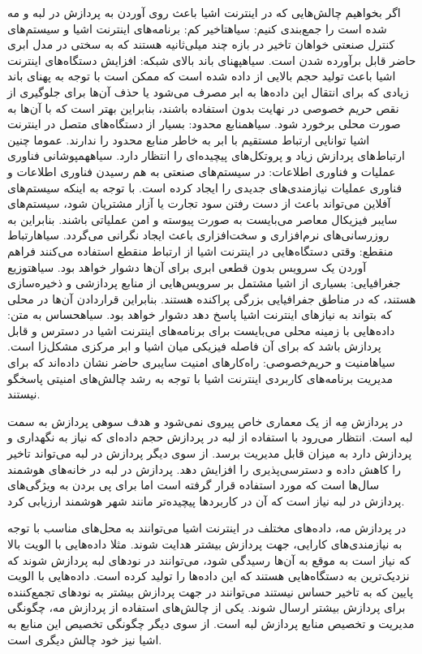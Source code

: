 اگر بخواهیم چالش‌هایی که در اینترنت اشیا باعث روی آوردن به پردازش در لبه و مه شده است را جمع‌بندی کنیم:
 ‌سیاه{تاخیر کم}: برنامه‌های اینترنت اشیا و سیستم‌های کنترل صنعتی خواهان تاخیر در بازه چند میلی‌ثانیه هستند که به سختی در مدل ابری حاضر قابل برآورده شدن است.
 ‌سیاه{پهنای باند بالای شبکه}: افزایش دستگاه‌های اینترنت اشیا باعث تولید حجم بالایی از داده شده است که ممکن است با توجه به پهنای باند زیادی که برای
انتقال این داده‌ها به ابر مصرف می‌شود یا حذف آن‌ها برای جلوگیری از نقص حریم خصوصی در نهایت
بدون استفاده باشند، بنابراین بهتر است که با آن‌ها به صورت محلی برخورد شود.
 ‌سیاه{منابع محدود}: بسیار از دستگاه‌های متصل در اینترنت اشیا توانایی ارتباط مستقیم با ابر به خاطر منابع محدود را ندارند. عموما چنین ارتباط‌های پردازش زیاد و پروتکل‌های پیچیده‌ای را انتظار دارد.
 ‌سیاه{همپوشانی فناوری عملیات و فناوری اطلاعات}: در سیستم‌های صنعتی به هم رسیدن فناوری اطلاعات و فناوری عملیات نیازمندی‌های جدیدی را ایجاد کرده است. با توجه به اینکه سیستم‌های آفلاین
می‌تواند باعث از دست رفتن سود تجارت یا آزار مشتریان شود، سیستم‌های سایبر فیزیکال معاصر می‌بایست به صورت پیوسته و امن عملیاتی باشند. بنابراین به روزرسانی‌های نرم‌افزاری و سخت‌افزاری باعث ایجاد نگرانی می‌گردد.
 ‌سیاه{ارتباط منقطع}: وقتی دستگاه‌هایی در اینترنت اشیا از ارتباط منقطع استفاده می‌کنند فراهم آوردن یک سرویس بدون قطعی ابری برای آن‌ها دشوار خواهد بود.
 ‌سیاه{توزیع جغرافیایی}: بسیاری از اشیا مشتمل بر سرویس‌هایی از منابع پردازشی و ذخیره‌سازی هستند، که در مناطق جفرافیایی بزرگی پراکنده هستند. بنابراین قراردادن آن‌ها در محلی که بتواند به نیازهای اینترنت اشیا پاسخ دهد
دشوار خواهد بود.
 ‌سیاه{حساس به متن}: داده‌هایی با زمینه محلی می‌بایست برای برنامه‌های اینترنت اشیا در دسترس و قابل پردازش باشد که برای آن فاصله فیزیکی میان اشیا و ابر مرکزی مشکل‌زا است.
 ‌سیاه{امنیت و حریم‌خصوصی}: راه‌کارهای امنیت سایبری حاضر نشان داده‌اند که برای مدیریت برنامه‌های کاربردی اینترنت اشیا با توجه به رشد چالش‌های امنیتی پاسخگو نیستند.

در پردازش مِه از یک معماری خاص پیروی نمی‌شود و هدف سوهی پردازش به سمت لبه است. انتظار می‌رود با استفاده از لبه در پردازش حجم داده‌ای که نیاز به نگهداری و پردازش دارد به میزان قابل مدیریت برسد.
از سوی دیگر پردازش در لبه می‌تواند تاخیر را کاهش داده و دسترسی‌پذیری را افزایش دهد. پردازش در لبه در خانه‌های هوشمند سال‌ها است که مورد استفاده قرار گرفته است اما برای پی بردن به ویژگی‌های پردازش در لبه
نیاز است که آن در کاربردها پیچیده‌تر مانند شهر هوشمند ارزیابی کرد.

در پردازش مه، داده‌های مختلف در اینترنت اشیا می‌توانند به محل‌های مناسب با توجه به نیازمندی‌های کارایی، جهت پردازش بیشتر هدایت شوند. مثلا داده‌هایی با الویت بالا که نیاز است به موقع به آن‌ها رسیدگی شود،
می‌توانند در نودهای لبه پردازش شوند که نزدیک‌ترین به دستگاه‌هایی هستند که این داده‌ها را تولید کرده است. داده‌هایی با الویت پایین که به تاخیر حساس نیستند می‌توانند در جهت پردازش بیشتر به نودهای تجمع‌کننده
برای پردازش بیشتر ارسال شوند.
یکی از چالش‌های استفاده از پردازش مه، چگونگی مدیریت و تخصیص منابع پردازش لبه است. از سوی دیگر چگونگی تخصیص این منابع به اشیا نیز خود چالش دیگری است.

